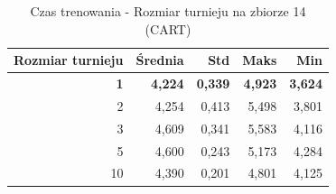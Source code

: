 \begin{table}[htbp]
\centering
\small
\setlength{\tabcolsep}{6pt}
\renewcommand{\arraystretch}{1.2}
\caption{Czas trenowania - Rozmiar turnieju na zbiorze 14 (CART)}
\label{tab:CART_tournament_size_14_time}
\begin{tabular}{r|r|r|r|r}
\toprule
Rozmiar turnieju & Średnia & Std & Maks & Min \\
\hline
\textbf{1} & \textbf{4,224} & \textbf{0,339} & \textbf{4,923} & \textbf{3,624} \\
2 & 4,254 & 0,413 & 5,498 & 3,801 \\
3 & 4,609 & 0,341 & 5,583 & 4,116 \\
5 & 4,600 & 0,243 & 5,173 & 4,284 \\
10 & 4,390 & 0,201 & 4,801 & 4,125 \\
\bottomrule
\end{tabular}
\end{table}